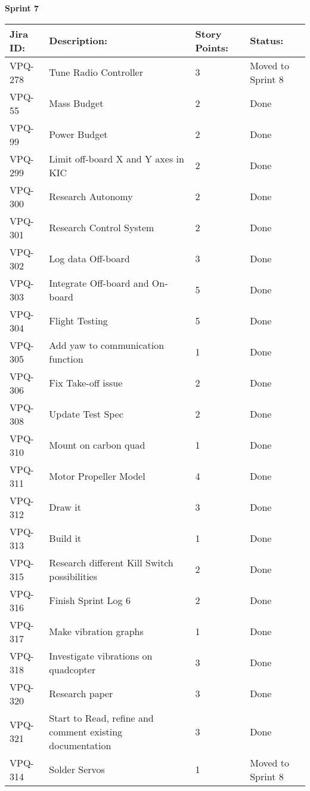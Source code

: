 \begin{table}[ht]
\centering\textbf{Sprint 7}
\begin{tabularx}{\linewidth}{|m{1.5cm} m{8.3cm} m{1.5cm} m{3.5cm}|}
\hline
    \rowcolor{cadetgrey} 
     \textbf{Jira ID:} & \textbf{Description:} &  \textbf{Story Points:} & \textbf{Status: } \\ \hline
      VPQ-278 & Tune Radio Controller & 3\centering & Moved to Sprint 8  \\ 
\rowcolor{gainsboro} VPQ-55 &  Mass Budget & 2\centering & Done  \\
      VPQ-99 & Power Budget & 2\centering & Done  \\
\rowcolor{gainsboro} VPQ-299 & Limit off-board X and Y axes in KIC  & 2\centering & Done  \\
      VPQ-300 & Research Autonomy & 2\centering & Done  \\
\rowcolor{gainsboro} VPQ-301 & Research Control System & 2\centering & Done  \\
      VPQ-302 & Log data Off-board & 3\centering & Done  \\
\rowcolor{gainsboro} VPQ-303 &  Integrate Off-board and On-board & 5\centering & Done  \\    
      VPQ-304 & Flight Testing & 5\centering & Done  \\
\rowcolor{gainsboro}  VPQ-305 & Add yaw to communication function & 1\centering & Done  \\
 VPQ-306 & Fix Take-off issue & 2\centering & Done  \\
\rowcolor{gainsboro}  VPQ-308 & Update Test Spec & 2\centering & Done  \\
 VPQ-310 & Mount on carbon quad & 1\centering & Done  \\
\rowcolor{gainsboro}  VPQ-311 & Motor Propeller Model & 4\centering & Done  \\
 VPQ-312 & Draw it & 3\centering & Done  \\
\rowcolor{gainsboro}  VPQ-313 & Build it & 1\centering & Done  \\
 VPQ-315 & Research different Kill Switch possibilities & 2\centering & Done  \\
\rowcolor{gainsboro}  VPQ-316 & Finish Sprint Log 6 & 2\centering & Done  \\
 VPQ-317 & Make vibration graphs & 1\centering & Done \\
\rowcolor{gainsboro}  VPQ-318 & Investigate vibrations on quadcopter & 3\centering & Done  \\
 VPQ-320 & Research paper & 3\centering & Done  \\
\rowcolor{gainsboro}  VPQ-321 & Start to Read, refine and comment existing documentation  & 3\centering & Done  \\
 VPQ-314 & Solder Servos & 1\centering & Moved to Sprint 8  \\
\hline    
\end{tabularx}
\end{table}


